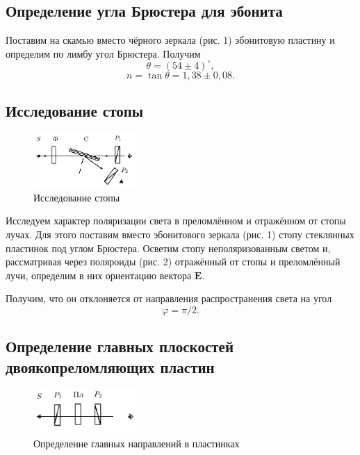 \documentclass[a4paper]{article}
\begin{document}
\subsection{Определение угла Брюстера для эбонита}

\noindent Поставим на скамью вместо чёрного зеркала (рис. 1) эбонитовую пластину и определим по лимбу угол Брюстера. Получим $$ \theta =(54 \pm 4) ^\circ,$$ $$n = \tan{\theta} = 1,38 \pm 0,08.$$ 

\subsection{Исследование стопы}


\begin{figure}[ht!]
    \centering
    \includegraphics[width = 0.35\textwidth]{image/pic2.png}
    \caption{Исследование стопы}
\end{figure}

\noindent Исследуем характер поляризации света в преломлённом и отражённом от стопы лучах. Для этого поставим вместо эбонитового зеркала (рис. 1) стопу стеклянных пластинок под углом Брюстера. Осветим стопу неполяризованным светом и, рассматривая через поляроиды (рис. 2) отражённый от стопы и преломлённый лучи, определим в них ориентацию вектора $ \mathbf{E} $. \medskip

\noindent Получим, что он отклоняется от направления распространения света на угол $$ \varphi = \pi/2. $$

\subsection{Определение главных плоскостей двоякопреломляющих пластин}

\begin{figure}[ht!]
    \centering
    \includegraphics[width = 0.35\textwidth]{image/pic3.png}
    \caption{Определение главных направлений в пластинках}
\end{figure}
\end{document}
